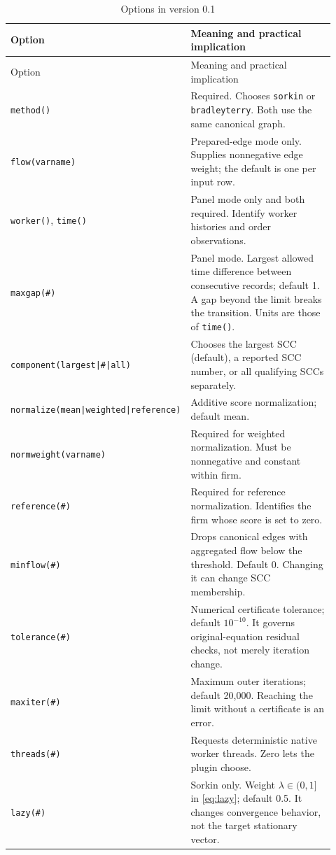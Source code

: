 \documentclass[11pt]{article}
\begin{document}
{\small
\begin{longtable}{@{}L{0.30\linewidth}L{0.62\linewidth}@{}}
\caption{Options in version 0.1}\label{tab:options}\\
\toprule
Option & Meaning and practical implication \\
\midrule
\endfirsthead
\toprule
Option & Meaning and practical implication \\
\midrule
\endhead
\texttt{method()} & Required. Chooses \texttt{sorkin} or \texttt{bradleyterry}. Both use the same canonical graph. \\
\texttt{flow(varname)} & Prepared-edge mode only. Supplies nonnegative edge weight; the default is one per input row. \\
\texttt{worker()}, \texttt{time()} & Panel mode only and both required. Identify worker histories and order observations. \\
\texttt{maxgap(\#)} & Panel mode. Largest allowed time difference between consecutive records; default 1. A gap beyond the limit breaks the transition. Units are those of \texttt{time()}. \\
\texttt{component(largest|\#|all)} & Chooses the largest SCC (default), a reported SCC number, or all qualifying SCCs separately. \\
\texttt{normalize(mean|}\linebreak\texttt{weighted|reference)} & Additive score normalization; default mean. \\
\texttt{normweight(varname)} & Required for weighted normalization. Must be nonnegative and constant within firm. \\
\texttt{reference(\#)} & Required for reference normalization. Identifies the firm whose score is set to zero. \\
\texttt{minflow(\#)} & Drops canonical edges with aggregated flow below the threshold. Default 0. Changing it can change SCC membership. \\
\texttt{tolerance(\#)} & Numerical certificate tolerance; default $10^{-10}$. It governs original-equation residual checks, not merely iteration change. \\
\texttt{maxiter(\#)} & Maximum outer iterations; default 20,000. Reaching the limit without a certificate is an error. \\
\texttt{threads(\#)} & Requests deterministic native worker threads. Zero lets the plugin choose. \\
\texttt{lazy(\#)} & Sorkin only. Weight $\lambda\in(0,1]$ in \cref{eq:lazy}; default 0.5. It changes convergence behavior, not the target stationary vector. \\

\end{longtable}}
\end{document}
